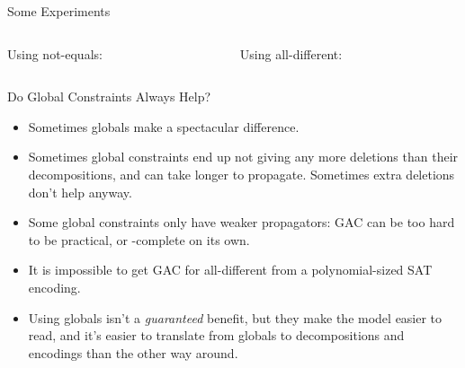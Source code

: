 \documentclass[aspectratio=169,compress,10pt]{beamer}
\begin{document}
\begin{frame}[t]{Some Experiments}
     {
        \scalebox{0.7}{
            \begin{minipage}{2\paperwidth}
                
        \end{minipage}}
    }

     {
        \begin{columns}[t]
            \begin{column}{0.45\textwidth}
                Using not-equals:
                
            \end{column}
            \begin{column}{0.45\textwidth}
                 {
                    Using all-different:
                    
                }
            \end{column}
        \end{columns}
    }
\end{frame}

\begin{frame}{Do Global Constraints Always Help?}
    \begin{itemize}
        \item Sometimes globals make a spectacular difference.

        \item Sometimes global constraints end up not giving any more deletions than their
            decompositions, and can take longer to propagate. Sometimes extra deletions don't help
            anyway.

        \item Some global constraints only have weaker propagators: GAC can be too hard to be
            practical, or \NP-complete on its own.

        \item It is impossible to get GAC for all-different from a polynomial-sized SAT encoding.

        \item Using globals isn't a \emph{guaranteed} benefit, but they make the model easier to
            read, and it's easier to translate from globals to decompositions and encodings than the
            other way around.
    \end{itemize}
\end{frame}
\end{document}
